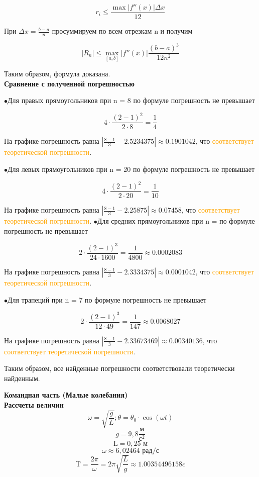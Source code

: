 \documentclass{beamer}
\begin{document}
	\[ r_i \leq \frac{\max|f''(x)| \Delta x}{12}\]
	
	При $\Delta x = \frac{b-a}{n}$ просуммируем по всем отрезкам n и получим
	
	\[|R_n| \leq \max_{[a, b]}|f''(x)| \frac{(b-a)^3}{12n^2}\]
	
	Таким образом, формула доказана. \\
	\newpage
	\textbf{Сравнение с полученной погрешностью}
	
	$\bullet$Для правых прямоугольников при n = 8 по формуле погрешность не превышает
	
	\[ 4 \cdot \frac{(2 - 1)^2}{2 \cdot 8} = \frac{1}{4}\]
	
	На графике погрешность равна $\left| \frac{8 - 1}{3} - 2.5234375 \right| \approx 0.1901042$, что \textcolor{orange}{соответствует теоретической погрешности}.
	
	$\bullet$Для левых прямоугольников при n = 20 по формуле погрешность не превышает
	
	\[ 4 \cdot \frac{(2 - 1)^2}{2 \cdot 20} = \frac{1}{10}\]
	
	На графике погрешность равна $\left| \frac{8 - 1}{3} - 2.25875 \right| \approx 0.07458$, что \textcolor{orange}{соответствует теоретической погрешности}.
	\newpage
	$\bullet$Для средних прямоугольников при n =  по формуле погрешность не превышает
	
	\[ 2 \cdot \frac{(2 - 1)^3}{24 \cdot 1600} = \frac{1}{4800} \approx 0.0002083\]
	
	На графике погрешность равна $\left| \frac{8 - 1}{3} - 2.3334375 \right| \approx 0.0001042$, что \textcolor{orange}{соответствует теоретической погрешности}.
	
	$\bullet$Для трапеций при n = 7 по формуле погрешность не превышает
	
	\[ 2 \cdot \frac{(2 - 1)^3}{12 \cdot 49} = \frac{1}{147} \approx 0.0068027\]
	
	На графике погрешность равна $\left| \frac{8 - 1}{3} - 2.33673469 \right| \approx 0.00340136$, что \textcolor{orange}{соответствует теоретической погрешности}.
	
	Таким образом, все найденные погрешности соответствовали теоретически найденным.
	
	
	\newpage
	
	\large \textbf{\textcolor{structure.fg}{Командная часть (Малые колебания)}}\\
	\textbf{Рассчеты величин}
	\[\omega = \sqrt{\frac{g}{L}}; \theta = \theta_{0} \cdot \cos(\omega t)\]
	\[g = 9,8 \frac{\text{м}}{\text{с}^2}\]
	\[\text{L} = 0,25 \text{ м}\]
	\[\omega \approx 6,02464 \text{ рад/с}\]
	\[\text{T} = \frac{2\pi}{\omega} = 2\pi\sqrt{\frac{L}{g}} \approx 1.00354496158 c\]
	\newline
\end{document}

